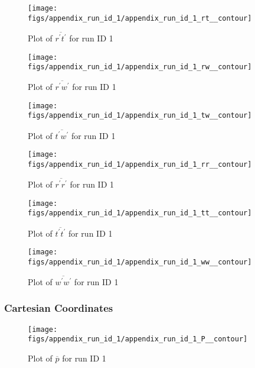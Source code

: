 \begin{figure}[H]
\centering
\texttt{[image: figs/appendix\_run\_id\_1/appendix\_run\_id\_1\_rt\_\_contour]}
\caption{Plot of $\overline{r^\prime t^\prime}$ for run ID 1}
\label{fig:appendix_run_id_1_rt__contour}
\end{figure}


\begin{figure}[H]
\centering
\texttt{[image: figs/appendix\_run\_id\_1/appendix\_run\_id\_1\_rw\_\_contour]}
\caption{Plot of $\overline{r^\prime w^\prime}$ for run ID 1}
\label{fig:appendix_run_id_1_rw__contour}
\end{figure}


\begin{figure}[H]
\centering
\texttt{[image: figs/appendix\_run\_id\_1/appendix\_run\_id\_1\_tw\_\_contour]}
\caption{Plot of $\overline{t^\prime w^\prime}$ for run ID 1}
\label{fig:appendix_run_id_1_tw__contour}
\end{figure}


\begin{figure}[H]
\centering
\texttt{[image: figs/appendix\_run\_id\_1/appendix\_run\_id\_1\_rr\_\_contour]}
\caption{Plot of $\overline{r^\prime r^\prime}$ for run ID 1}
\label{fig:appendix_run_id_1_rr__contour}
\end{figure}


\begin{figure}[H]
\centering
\texttt{[image: figs/appendix\_run\_id\_1/appendix\_run\_id\_1\_tt\_\_contour]}
\caption{Plot of $\overline{t^\prime t^\prime}$ for run ID 1}
\label{fig:appendix_run_id_1_tt__contour}
\end{figure}


\begin{figure}[H]
\centering
\texttt{[image: figs/appendix\_run\_id\_1/appendix\_run\_id\_1\_ww\_\_contour]}
\caption{Plot of $\overline{w^\prime w^\prime}$ for run ID 1}
\label{fig:appendix_run_id_1_ww__contour}
\end{figure}


\subsubsection{Cartesian Coordinates}
\begin{figure}[H]
\centering
\texttt{[image: figs/appendix\_run\_id\_1/appendix\_run\_id\_1\_P\_\_contour]}
\caption{Plot of $\overline{p}$ for run ID 1}
\label{fig:appendix_run_id_1_P__contour}
\end{figure}


